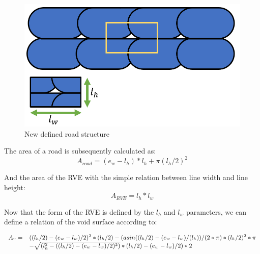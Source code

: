 \begin{figure}[htb]
    \centering
    \includegraphics[width=1\textwidth]{chapter_4_RVE_Definition/figures/Roadstructure2.PNG}
    \caption{New defined road structure}
    \label{fig:Roadstructure2}
\end{figure}

The area of a road is subsequently calculated as: 
\begin{equation}
A_{road}=(e_w-l_h)*l_h+\pi(l_h/2)^2
\end{equation}

And the area of the RVE with the simple relation between line width and line height:
\begin{equation}
A_{RVE}=l_h*l_w
\end{equation}

Now that the form of the RVE is defined by the $l_h$ and $l_w$ parameters, we can define a relation of the void surface according to: 

\begin{equation}
\small
\begin{array}{ll}
A_v = & ((l_h/2)-(e_w-l_w)/2)^2*(l_h/2)-(asin((l_h/2)-(e_w-l_w)/(l_h))/(2*\pi)*(l_h/2)^2*\pi 
\\
& -\sqrt{(l_h^2-((l_h/2)-(e_w-l_w)/2)^2 )}*(l_h/2)-(e_w-l_w)/2 )*2
\end{array}
\end{equation}

